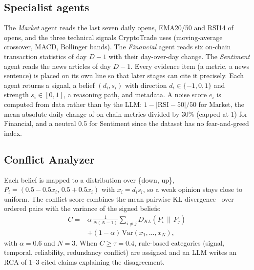 \documentclass[11pt]{article}
\begin{document}
\subsection{Specialist agents}
The \emph{Market} agent reads the last seven daily opens, EMA20/50 and RSI14 of opens, and the three technical signals
CryptoTrade uses (moving-average crossover, MACD, Bollinger bands). The \emph{Financial} agent reads six on-chain
transaction statistics of day $D{-}1$ with their day-over-day change. The \emph{Sentiment} agent reads the news
articles of day $D{-}1$. Every evidence item (a metric, a news sentence) is placed on its own line so that later stages
can cite it precisely. Each agent returns a signal, a belief $(d_i, s_i)$ with direction $d_i\in\{-1,0,1\}$ and
strength $s_i\in[0,1]$, a reasoning path, and metadata. A noise score $e_i$ is computed from data rather than by the
LLM: $1-|\text{RSI}-50|/50$ for Market, the mean absolute daily change of on-chain metrics divided by 30\% (capped at
1) for Financial, and a neutral 0.5 for Sentiment since the dataset has no fear-and-greed index.

\subsection{Conflict Analyzer}
Each belief is mapped to a distribution over \{down, up\}, $P_i=(0.5-0.5x_i,\,0.5+0.5x_i)$ with $x_i=d_i s_i$, so a
weak opinion stays close to uniform. The conflict score combines the mean pairwise KL divergence~\citep{kullback1951}
over ordered pairs with the variance of the signed beliefs:
\begin{equation}
\begin{aligned}
C={}&\alpha\,\tfrac{1}{N(N-1)}\textstyle\sum_{i\neq j}D_{KL}(P_i\,\|\,P_j)\\
&+(1-\alpha)\,\mathrm{Var}(x_1,\dots,x_N),
\end{aligned}
\end{equation}
with $\alpha=0.6$ and $N=3$. When $C\geq\tau=0.4$, rule-based categories (signal, temporal, reliability, redundancy
conflict) are assigned and an LLM writes an RCA of 1--3 cited claims explaining the disagreement.
\end{document}
